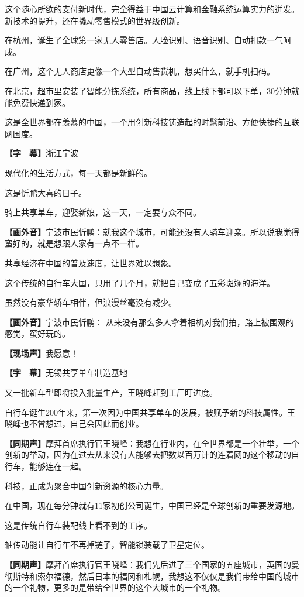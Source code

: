 \documentclass{ctexart}
\newcommand{\zkh}[1]{\textbf{\hspace{-2.7em} 【#1】}}
\begin{document}
这个随心所欲的支付新时代，完全得益于中国云计算和金融系统运算实力的迸发。新技术的提升，还在撬动零售模式的世界级创新。

 在杭州，诞生了全球第一家无人零售店。人脸识别、语音识别、自动扣款一气呵成。

 在广州，这个无人商店更像一个大型自动售货机，想买什么，就手机扫码。

在北京，超市里安装了智能分拣系统，所有商品，线上线下都可以下单，30分钟就能免费快递到家。

这是全世界都在羡慕的中国，一个用创新科技铸造起的时髦前沿、方便快捷的互联网国度。

 \zkh{字　幕}浙江宁波

 现代化的生活方式，每一天都是新鲜的。

 这是忻鹏大喜的日子。

 骑上共享单车，迎娶新娘，这一天，一定要与众不同。

 \zkh{画外音}宁波市民忻鹏：就我这个城市，可能还没有人骑车迎亲。所以说我觉得蛮好的，就是想跟人家有一点不一样。

 共享经济在中国的普及速度，让世界难以想象。

 这个传统的自行车大国，只用了几个月，就把自己变成了五彩斑斓的海洋。

 虽然没有豪华轿车相伴，但浪漫丝毫没有减少。

 \zkh{画外音}宁波市民忻鹏： 从来没有那么多人拿着相机对我们拍，路上被围观的感觉，蛮好玩的。

 \zkh{现场声}我愿意！

 \zkh{字　幕}无锡共享单车制造基地

 又一批新车型即将投入批量生产，王晓峰赶到工厂盯进度。

自行车诞生200年来，第一次因为中国共享单车的发展，被赋予新的科技属性。王晓峰也不曾想过，自己会因此而创业。

 \zkh{同期声}摩拜首席执行官王晓峰：我想在行业内，在全世界都是一个壮举，一个创新的举动，因为在过去从来没有人能够去把数以百万计的连着网的这个移动的自行车，能够连在一起。

 科技，正成为聚合中国创新资源的核心力量。

 在中国，现在每分钟就有11家初创公司诞生，中国已经是全球创新的重要发源地。

 这是传统自行车装配线上看不到的工序。

 轴传动能让自行车不再掉链子，智能锁装载了卫星定位。

 \zkh{同期声}摩拜首席执行官王晓峰：我们先后进了三个国家的五座城市，英国的曼彻斯特和索尔福德，然后日本的福冈和札幌，我想这不仅仅是我们带给中国的城市的一个礼物，更多的是带给全世界的这个大城市的一个礼物。
\end{document}
